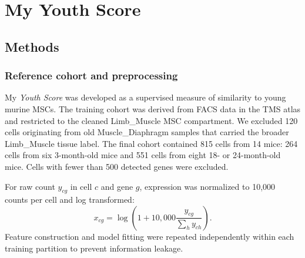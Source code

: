\documentclass[10pt,twocolumn]{article}
\newcommand{\YouthScore}{\textit{Youth Score}}
\begin{document}
\raggedbottom


\section{My Youth Score}

\subsection{Methods}

\subsubsection{Reference cohort and preprocessing}

My \YouthScore{} was developed as a supervised measure of similarity to young murine MSCs. The training cohort was derived from FACS data in the TMS atlas \citep{tabulamuris2020} and restricted to the cleaned Limb\_Muscle MSC compartment. We excluded 120 cells originating from old Muscle\_Diaphragm samples that carried the broader Limb\_Muscle tissue label. The final cohort contained 815 cells from 14 mice: 264 cells from six 3-month-old mice and 551 cells from eight 18- or 24-month-old mice. Cells with fewer than 500 detected genes were excluded.

For raw count $y_{cg}$ in cell $c$ and gene $g$, expression was normalized to 10,000 counts per cell and log transformed:
\begin{equation}
x_{cg}=\log\!\left(1+10{,}000\frac{y_{cg}}{\sum_h y_{ch}}\right).
\end{equation}
Feature construction and model fitting were repeated independently within each training partition to prevent information leakage.
\end{document}

